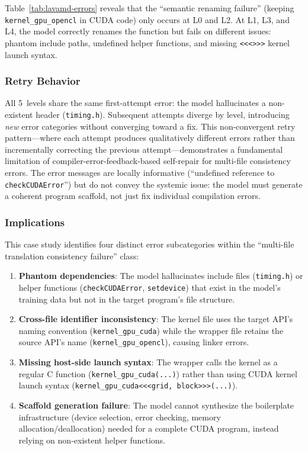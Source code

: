 Table~\ref{tab:lavamd-errors} reveals that the ``semantic renaming failure''
(keeping \texttt{kernel\_gpu\_opencl} in CUDA code) only occurs at L0 and L2. At
L1, L3, and L4, the model correctly renames the function but fails on different
issues: phantom include paths, undefined helper functions, and missing
\texttt{<<<>>>} kernel launch syntax.

\subsubsection*{Retry Behavior}

All 5~levels share the same first-attempt error: the model hallucinates a
non-existent header (\texttt{timing.h}). Subsequent attempts diverge by level,
introducing \emph{new} error categories without converging toward a fix. This
non-convergent retry pattern---where each attempt produces qualitatively
different errors rather than incrementally correcting the previous
attempt---demonstrates a fundamental limitation of compiler-error-feedback-based
self-repair for multi-file consistency errors. The error messages are locally
informative (``undefined reference to \texttt{checkCUDAError}'') but do not
convey the systemic issue: the model must generate a coherent program scaffold,
not just fix individual compilation errors.

\subsubsection*{Implications}

This case study identifies four distinct error subcategories within the
``multi-file translation consistency failure'' class:

\begin{enumerate}
  \item \textbf{Phantom dependencies}: The model hallucinates include files
    (\texttt{timing.h}) or helper functions (\texttt{checkCUDAError},
    \texttt{setdevice}) that exist in the model's training data but not in the
    target program's file structure.

  \item \textbf{Cross-file identifier inconsistency}: The kernel file uses the
    target API's naming convention (\texttt{kernel\_gpu\_cuda}) while the wrapper
    file retains the source API's name (\texttt{kernel\_gpu\_opencl}), causing
    linker errors.

  \item \textbf{Missing host-side launch syntax}: The wrapper calls the kernel
    as a regular C function (\texttt{kernel\_gpu\_cuda(...)}) rather than using
    CUDA kernel launch syntax (\texttt{kernel\_gpu\_cuda<<<grid, block>>>(...)}).

  \item \textbf{Scaffold generation failure}: The model cannot synthesize the
    boilerplate infrastructure (device selection, error checking, memory
    allocation/deallocation) needed for a complete CUDA program, instead relying
    on non-existent helper functions.
\end{enumerate}

